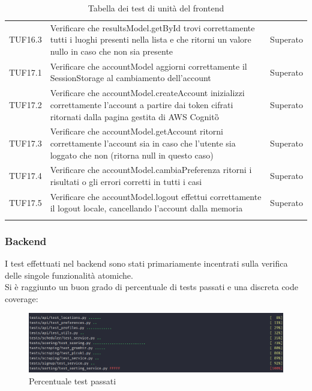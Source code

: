 {\begin{longtable}{C{.3\freewidth} C{.5\freewidth} C{.3\freewidth}}
        TUF16.3 & Verificare che resultsModel.getById trovi correttamente tutti i luoghi presenti nella lista 
                e che ritorni un valore nullo in caso che non sia presente & Superato \\

        TUF17.1 & Verificare che accountModel aggiorni correttamente il SessionStorage al cambiamento dell'account & Superato \\

        TUF17.2 & Verificare che accountModel.createAccount inizializzi correttamente l'account a partire dai token cifrati 
                ritornati dalla pagina gestita di AWS Cognito\G{} & Superato \\

        TUF17.3 & Verificare che accountModel.getAccount ritorni correttamente l'account sia in caso 
                che l'utente sia loggato che non (ritorna null in questo caso) & Superato \\

        TUF17.4 & Verificare che accountModel.cambiaPreferenza ritorni i risultati o gli errori corretti in tutti i casi & Superato \\

        TUF17.5 & Verificare che accountModel.logout effettui correttamente il logout locale, 
                cancellando l'account dalla memoria & Superato \\

        \bottomrule
        \caption{Tabella dei test di unità del frontend}
        \end{longtable}
    }
    \subsubsection{Backend}
    I test effettuati nel backend sono stati primariamente incentrati sulla verifica
    delle singole funzionalità atomiche.\\
    Si è raggiunto un buon grado di percentuale di tests passati e una discreta code coverage:
    \begin{figure}[H]
        \centering
        \includegraphics[scale = 0.4]{sezioni/Images/backend_test_passed.png}
        \caption{Percentuale test passati}
    \end{figure}

